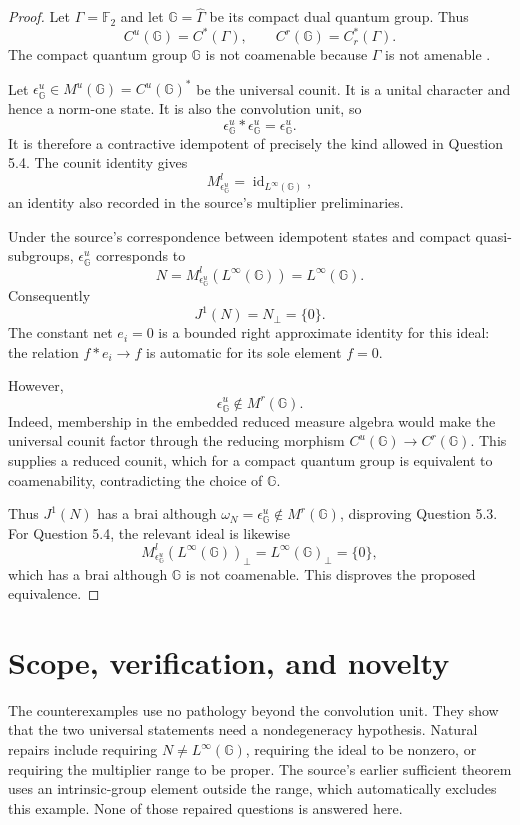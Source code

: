 \documentclass[11pt]{article}
\begin{document}
\begin{proof}
Let $\Gamma=\mathbb F_2$ and let $\mathbb G=\widehat\Gamma$ be its compact
dual quantum group. Thus
\[
 C^u(\mathbb G)=C^*(\Gamma),\qquad
 C^r(\mathbb G)=C_r^*(\Gamma).
\]
The compact quantum group $\mathbb G$ is not coamenable because $\Gamma$ is
not amenable \cite{bedos}.

Let $\epsilon_{\mathbb G}^u\in M^u(\mathbb G)=C^u(\mathbb G)^*$ be the
universal counit. It is a unital character and hence a norm-one state. It is
also the convolution unit, so
\[
 \epsilon_{\mathbb G}^u*\epsilon_{\mathbb G}^u
 =\epsilon_{\mathbb G}^u.
\]
It is therefore a contractive idempotent of precisely the kind allowed in
Question 5.4. The counit identity gives
\[
 M^l_{\epsilon_{\mathbb G}^u}=\operatorname{id}_{L^\infty(\mathbb G)},
\]
an identity also recorded in the source's multiplier preliminaries.

Under the source's correspondence between idempotent states and compact
quasi-subgroups, $\epsilon_{\mathbb G}^u$ corresponds to
\[
 N=M^l_{\epsilon_{\mathbb G}^u}(L^\infty(\mathbb G))
   =L^\infty(\mathbb G).
\]
Consequently
\[
 J^1(N)=N_\perp=\{0\}.
\]
The constant net $e_i=0$ is a bounded right approximate identity for this
ideal: the relation $f*e_i\to f$ is automatic for its sole element $f=0$.

However,
\[
 \epsilon_{\mathbb G}^u\notin M^r(\mathbb G).
\]
Indeed, membership in the embedded reduced measure algebra would make the
universal counit factor through the reducing morphism
$C^u(\mathbb G)\to C^r(\mathbb G)$. This supplies a reduced counit, which for
a compact quantum group is equivalent to coamenability, contradicting the
choice of $\mathbb G$.

Thus $J^1(N)$ has a brai although
$\omega_N=\epsilon_{\mathbb G}^u\notin M^r(\mathbb G)$, disproving Question
5.3. For Question 5.4, the relevant ideal is likewise
\[
 M^l_{\epsilon_{\mathbb G}^u}(L^\infty(\mathbb G))_\perp
 =L^\infty(\mathbb G)_\perp=\{0\},
\]
which has a brai although $\mathbb G$ is not coamenable. This disproves the
proposed equivalence.
\end{proof}

\section{Scope, verification, and novelty}

The counterexamples use no pathology beyond the convolution unit. They show
that the two universal statements need a nondegeneracy hypothesis. Natural
repairs include requiring $N\neq L^\infty(\mathbb G)$, requiring the ideal to
be nonzero, or requiring the multiplier range to be proper. The source's
earlier sufficient theorem uses an intrinsic-group element outside the
range, which automatically excludes this example. None of those repaired
questions is answered here.
\end{document}
